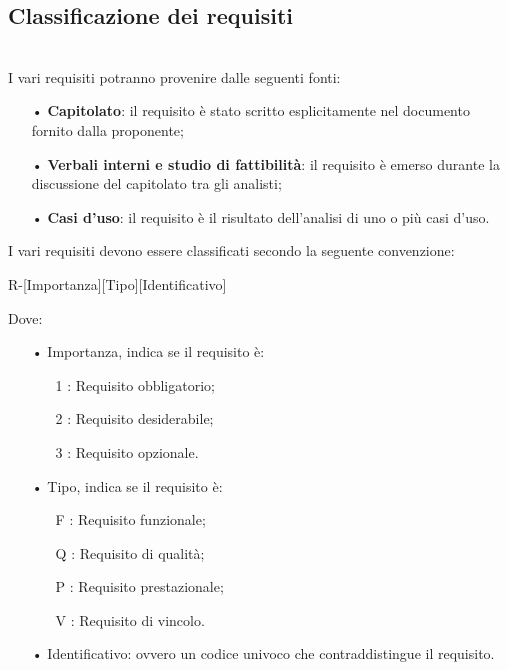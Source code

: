 \subsection{Classificazione dei requisiti}\mbox{}\\
I vari requisiti potranno provenire dalle seguenti fonti:
\begin{itemize}
	\item[•] \textbf{Capitolato}: il requisito è stato scritto esplicitamente nel documento fornito dalla proponente;
	\item[•] \textbf{Verbali interni e studio di fattibilità}: il requisito è emerso durante la discussione del capitolato tra gli analisti;
	\item[•] \textbf{Casi d'uso}: il requisito è il risultato dell'analisi di uno o più casi d'uso.
\end{itemize}

I vari requisiti devono essere classificati secondo la seguente convenzione:
\begin{center}
	R-[Importanza][Tipo][Identificativo]
\end{center}
Dove:
\begin{itemize}
	\item[•] Importanza, indica se il requisito è:
	\begin{itemize}
		\item[1]: Requisito obbligatorio;
		\item[2]: Requisito desiderabile;
		\item[3]: Requisito opzionale.
	\end{itemize}
	\item[•] Tipo, indica se il requisito è:
	\begin{itemize}
		\item[F]: Requisito funzionale;
		\item[Q]: Requisito di qualità;
		\item[P]: Requisito prestazionale;
		\item[V]: Requisito di vincolo.
	\end{itemize}
	\item[•] Identificativo: ovvero un codice univoco che contraddistingue il requisito.
\end{itemize}

